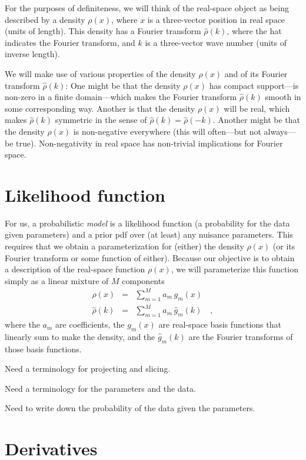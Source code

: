 \documentclass[12pt]{article}
\begin{document}
For the purposes of definiteness, we will think of the real-space
object as being described by a density $\rho(x)$, where $x$ is
a three-vector position in real space (units of length).
This density has a Fourier transform $\hat{\rho}(k)$, where the hat
indicates the Fourier transform, and $k$ is a three-vector wave number
(units of inverse length).

We will make use of various properties of the density $\rho(x)$ and of
its Fourier transform $\hat{\rho}(k)$:
One might be that the density $\rho(x)$ has compact support---is
non-zero in a finite domain---which makes the Fourier transform
$\hat{\rho}(k)$ smooth in some corresponding way.
Another is that the density $\rho(x)$ will be real, which makes
$\hat{\rho}(k)$ symmetric in the sense of
$\hat{\rho}(k)=\hat{\rho}(-k)$.
Another might be that the density $\rho(x)$ is non-negative everywhere
(this will often---but not always---be true).
Non-negativity in real space has non-trivial implications for Fourier
space.

\section{Likelihood function}

For us, a probabilistic \emph{model} is a likelihood function (a
probability for the data given parameters) and a prior pdf over (at
least) any nuisance parameters.
This requires that we obtain a parameterization for (either) the
density $\rho(x)$ (or its Fourier transform or some function of
either).
Because our objective is to obtain a description of the real-space
function $\rho(x)$, we will parameterize this function simply as a
linear mixture of $M$ components
\begin{eqnarray}
       \rho(x)  &=& \sum_{m=1}^M a_m\,     g_m(x)
  \\
  \hat{\rho}(k) &=& \sum_{m=1}^M a_m\,\hat{g}_m(k)
\quad ,
\end{eqnarray}
where the $a_m$ are coefficients, the $g_m(x)$ are real-space basis
functions that linearly sum to make the density, and the
$\hat{g}_m(k)$ are the Fourier transforms of those basis functions.

Need a terminology for projecting and slicing.

Need a terminology for the parameters and the data.

Need to write down the probability of the data given the parameters.

\section{Derivatives}
\end{document}
